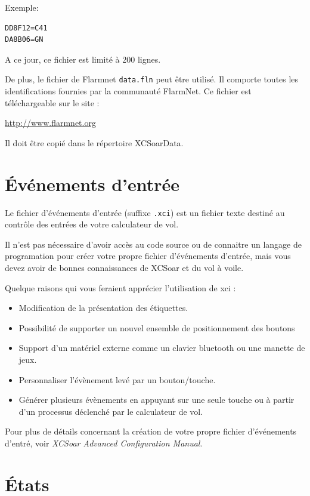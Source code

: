 Exemple:
\begin{verbatim}
DD8F12=C41
DA8B06=GN
\end{verbatim}

A ce jour, ce fichier est limité à 200 lignes.

De plus, le fichier de Flarmnet \verb|data.fln| peut être utilisé. Il comporte toutes les identifications fournies par la communauté FlarmNet. Ce fichier est téléchargeable sur le site :

\url{http://www.flarmnet.org}

Il doit être copié dans le répertoire XCSoarData.

\section{Événements d'entrée}

Le fichier d'événements d'entrée (suffixe  \verb|.xci|) est un fichier texte destiné au contrôle des entrées de votre calculateur de vol.

Il n'est pas nécessaire d'avoir accès au code source ou de connaitre un langage de programation pour créer votre propre fichier d'événements d'entrée, mais vous devez avoir de bonnes connaissances de XCSoar et du vol à voile.


Quelque raisons qui vous feraient apprécier l'utilisation de xci :
\begin{itemize}
\item Modification de la présentation des étiquettes.
\item Possibilité de supporter un nouvel ensemble de positionnement des boutons
\item Support d'un matériel externe comme un clavier bluetooth ou une manette de jeux.
\item Personnaliser l'évènement levé par un bouton/touche.
\item Générer plusieurs évènements en appuyant sur une seule touche ou à partir d'un processus déclenché par le calculateur de vol.
\end{itemize}

Pour plus de détails concernant la création de votre propre fichier d'événements d'entré, voir  {\em XCSoar Advanced Configuration Manual}.

\section{États}\label{sec:status-file}

